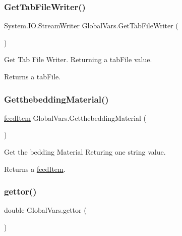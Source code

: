 \subsubsection{\texorpdfstring{GetTabFileWriter()}{GetTabFileWriter()}}
{\footnotesize\ttfamily System.\+I\+O.\+Stream\+Writer Global\+Vars.\+Get\+Tab\+File\+Writer (\begin{DoxyParamCaption}{ }\end{DoxyParamCaption})\hspace{0.3cm}{\ttfamily [inline]}}



Get Tab File Writer. Returning a tab\+File value. 

\begin{DoxyReturn}{Returns}
a tab\+File. 
\end{DoxyReturn}
\mbox{\label{class_global_vars_a94dc7347c7b4fc213dc302d321b33b9e}} 
\subsubsection{\texorpdfstring{GetthebeddingMaterial()}{GetthebeddingMaterial()}}
{\footnotesize\ttfamily \mbox{\hyperlink{classfeed_item}{feed\+Item}} Global\+Vars.\+Getthebedding\+Material (\begin{DoxyParamCaption}{ }\end{DoxyParamCaption})\hspace{0.3cm}{\ttfamily [inline]}}



Get the bedding Material Returing one string value. 

\begin{DoxyReturn}{Returns}
a \mbox{\hyperlink{classfeed_item}{feed\+Item}}. 
\end{DoxyReturn}
\mbox{\label{class_global_vars_a60e8f9c8b6c0c733505a44c6d90ee683}} 
\subsubsection{\texorpdfstring{gettor()}{gettor()}}
{\footnotesize\ttfamily double Global\+Vars.\+gettor (\begin{DoxyParamCaption}{ }\end{DoxyParamCaption})\hspace{0.3cm}{\ttfamily [inline]}}



